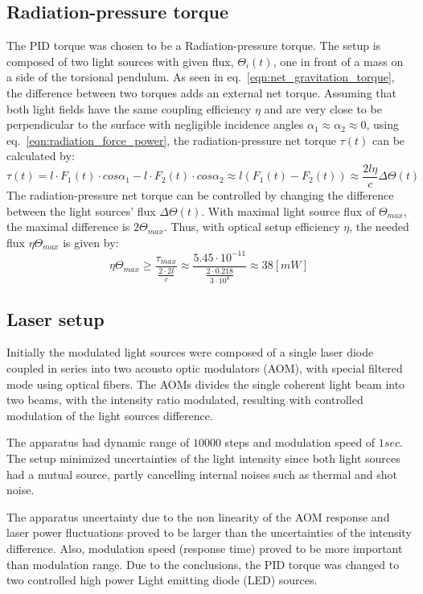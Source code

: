 \documentclass[\main/master.tex]{subfiles}
\begin{document}
\subsection{Radiation-pressure torque}
The PID torque was chosen to be a Radiation-pressure torque. The setup is composed of two light sources with given flux, $\Theta_i(t)$, one in front of a mass on a side of the torsional pendulum. As seen in eq.~\ref{eqn:net_gravitation_torque}, the difference between two torques adds an external net torque. Assuming that both light fields have the same coupling efficiency $\eta$ and are very close to be perpendicular to the surface with negligible incidence angles $\alpha_1\approx\alpha_2\approx 0$, using eq.~\ref{eqn:radiation_force_power}, the radiation-pressure net torque $\tau(t)$ can be calculated by:  
\begin{equation}
\tau(t) = l\cdot F_1(t) \cdot cos\alpha_1 - l\cdot F_2(t) \cdot cos\alpha_2\approx l(F_1(t) - F_2(t)) \approx \frac{2l\eta}{{c}} \Delta \Theta(t) \label{eqn:radiation torque}
\end{equation}
The radiation-pressure net torque can be controlled by changing the difference between the light sources' flux $\Delta \Theta(t)$. With maximal light source flux of $\Theta_{max}$, the maximal difference is $2 \Theta_{max}$. Thus, with optical setup efficiency $\eta$, the needed flux $\eta\Theta_{max}$ is given by: 
\begin{equation}
\eta\Theta_{max} \geq \frac{\tau_{max}}{\frac{2\cdot2 l}{c}}\approx \frac{5.45\cdot10^{-11}}{\frac{2\cdot 0.218}{3\cdot10^{8}}}\approx 38 [mW]
\label{eqn:max radiation torque}
\end{equation}

\subsection{Laser setup}
Initially the modulated light sources were composed of a single laser diode coupled in series into two acousto optic modulators (AOM), with special filtered mode using optical fibers. The AOMs divides the single coherent light beam into two beams, with the intensity ratio modulated, resulting with controlled modulation of the light sources difference.
\par\noindent
The apparatus had dynamic range of $10000$ steps and modulation speed of $1 sec$. The setup minimized uncertainties of the light intensity since both light sources had a mutual source, partly cancelling internal noises such as thermal and shot noise. 
\par\noindent
The apparatus uncertainty due to the non linearity of the AOM response and laser power fluctuations proved to be larger than the uncertainties of the intensity difference. Also, modulation speed (response time) proved to be more important than modulation range. Due to the conclusions, the PID torque was changed to two controlled high power Light emitting diode (LED) sources.
\end{document}
